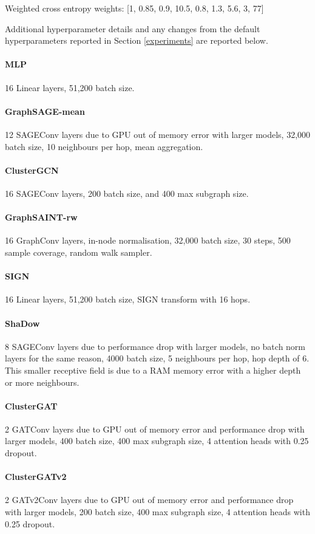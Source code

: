\documentclass{article}
\begin{document}
Weighted cross entropy weights: [1, 0.85, 0.9, 10.5, 0.8, 1.3, 5.6, 3, 77]

Additional hyperparameter details and any changes from the default hyperparameters reported in Section \ref{experiments} are reported below.

\paragraph{MLP} 16 Linear layers, 51,200 batch size.
\paragraph{GraphSAGE-mean} 12 SAGEConv layers due to GPU out of memory error with larger models, 32,000 batch size, 10 neighbours per hop, mean aggregation.
\paragraph{ClusterGCN} 16 SAGEConv layers, 200 batch size, and 400 max subgraph size.
\paragraph{GraphSAINT-rw} 16 GraphConv layers, in-node normalisation, 32,000 batch size, 30 steps, 500 sample coverage, random walk sampler.
\paragraph{SIGN} 16 Linear layers, 51,200 batch size, SIGN transform with 16 hops.
\paragraph{ShaDow} 8 SAGEConv layers due to performance drop with larger models, no batch norm layers for the same reason, 4000 batch size, 5 neighbours per hop, hop depth of 6. This smaller receptive field is due to a RAM memory error with a higher depth or more neighbours.
\paragraph{ClusterGAT} 2 GATConv layers due to GPU out of memory error and performance drop with larger models, 400 batch size, 400 max subgraph size, 4 attention heads with 0.25 dropout.
\paragraph{ClusterGATv2} 2 GATv2Conv layers due to GPU out of memory error and performance drop with larger models, 200 batch size, 400 max subgraph size, 4 attention heads with 0.25 dropout.
\end{document}
